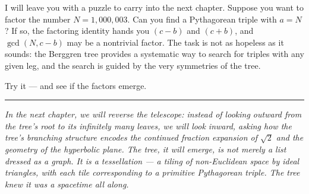 I will leave you with a puzzle to carry into the next chapter. Suppose you want to factor the number \(N = 1{,}000{,}003\). Can you find a Pythagorean triple with \(a = N\)? If so, the factoring identity hands you \((c - b)\) and \((c + b)\), and \(\gcd(N, c - b)\) may be a nontrivial factor. The task is not as hopeless as it sounds: the Berggren tree provides a systematic way to search for triples with any given leg, and the search is guided by the very symmetries of the tree.

Try it --- and see if the factors emerge.

\bigskip\noindent\rule{\linewidth}{0.4pt}\bigskip

\emph{In the next chapter, we will reverse the telescope: instead of looking outward from the tree's root to its infinitely many leaves, we will look inward, asking how the tree's branching structure encodes the continued fraction expansion of \(\sqrt{2}\) and the geometry of the hyperbolic plane. The tree, it will emerge, is not merely a list dressed as a graph. It is a tessellation --- a tiling of non-Euclidean space by ideal triangles, with each tile corresponding to a primitive Pythagorean triple. The tree knew it was a spacetime all along.}
